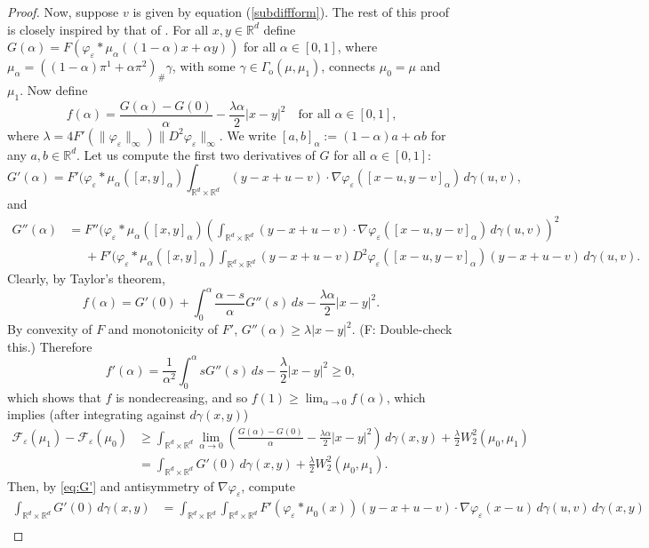 \documentclass[11pt,leqno]{amsart}
\theoremstyle{definition}
\newcommand{\be}{\begin{equation}}
\newcommand{\ee}{\end{equation}}
\newcommand{\bes}{\begin{equation*}}
\newcommand{\ees}{\end{equation*}}
\newcommand{\comment}[1]{{\color{red}#1}} %
\newcommand{\R}{{\mathord{\mathbb R}}}
\newcommand{\F}{\mathcal{F}}
\def\e{\varepsilon}
\newcommand{\irdrd}{\int_{\mathord{\mathbb R}^d \times \mathord{\mathbb R}^d}}
\def\F{\mathcal{F}}
\begin{document}
\begin{proof}
Now, suppose $v$ is given by equation (\ref{subdiffform}). The rest of this proof is closely inspired by that of \cite[Proposition 2.2]{5person}. For all $x,y \in \R^d$ define $G(\alpha) = F(\varphi_\e*\mu_\alpha((1-\alpha)x + \alpha y))$ for all $\alpha \in [0,1]$, where $\mu_\alpha = ((1-\alpha)\pi^1 + \alpha \pi^2)_\#\gamma$, with some $\gamma \in \Gamma_\mathrm{o}(\mu,\mu_1)$, connects $\mu_0=\mu$ and $\mu_1$. Now define
\bes
	f(\alpha) = \frac{G(\alpha) - G(0)}{\alpha} - \frac{\lambda \alpha}{2}|x-y|^2 \quad \mbox{for all $\alpha \in [0,1]$,}
\ees
where \comment{$\lambda = 4F'(\|\varphi_\e\|_\infty)\|D^2\varphi_\e\|_\infty$}. We write $[a,b]_\alpha := (1-\alpha)a +\alpha b$ for any $a,b\in\R^d$. Let us compute the first two derivatives of $G$ for all $\alpha \in [0,1]$:
\be\label{eq:G'}
	G'(\alpha) = F'(\varphi_\e*\mu_\alpha([x,y]_\alpha) \irdrd (y-x  + u-v) \cdot \nabla \varphi_\e([x-u,y-v]_\alpha)\,d\gamma(u,v),
\ee
and
\begin{align*}
	G''(\alpha) &= F''(\varphi_\e*\mu_\alpha([x,y]_\alpha) \left( \irdrd (y-x  + u-v) \cdot \nabla \varphi_\e([x-u,y-v]_\alpha)\,d\gamma(u,v) \right)^2\\
	&\phantom{{}={}}+ F'(\varphi_\e*\mu_\alpha([x,y]_\alpha) \irdrd (y-x  + u-v) D^2\varphi_\e([x-u,y-v]_\alpha)(y-x  + u-v) \,d\gamma(u,v).
\end{align*}
Clearly, by Taylor's theorem, 
\bes
	f(\alpha) = G'(0) + \int_0^\alpha \frac{\alpha-s}{\alpha} G''(s) \,d s - \frac{\lambda \alpha}{2}|x-y|^2.
\ees
By convexity of $F$ and monotonicity of $F'$, $G''(\alpha) \geq \lambda |x-y|^2$. \comment{(F: Double-check this.)} Therefore
\bes
	f'(\alpha) = \frac{1}{\alpha^2} \int_0^\alpha sG''(s) \,ds - \frac{\lambda}{2}|x-y|^2 \geq 0,
\ees
which shows that $f$ is nondecreasing, and so $f(1) \geq \lim_{\alpha \to 0} f(\alpha)$, which implies (after integrating against $d\gamma(x,y)$)
\begin{align*}
	\F_\e(\mu_1) - \F_\e(\mu_0) &\geq \irdrd \lim_{\alpha \to 0} \left(\frac{G(\alpha) - G(0)}{\alpha} - \frac{\lambda \alpha}{2}|x-y|^2\right) \,d\gamma(x,y) + \frac{\lambda}{2}W_2^2(\mu_0,\mu_1)\\
	&= \irdrd G'(0) \,d\gamma(x,y) + \frac{\lambda}{2}W_2^2(\mu_0,\mu_1).
\end{align*}
Then, by \eqref{eq:G'} and antisymmetry of $\nabla \varphi_\e$, compute
\begin{align*}
	\irdrd G'(0) \,d\gamma(x,y) &= \irdrd \irdrd  F'(\varphi_\e*\mu_0(x)) (y-x  + u-v) \cdot \nabla \varphi_\e(x-u)\,d\gamma(u,v) \,d\gamma(x,y)\\

\end{align*}
\end{proof}
\end{document}
